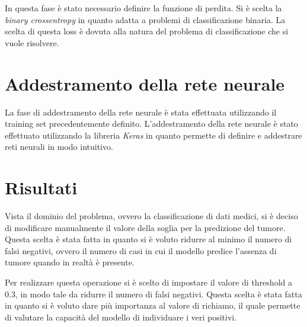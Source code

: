In questa fase è stato necessario definire la funzione di perdita. Si è scelta
la \textit{binary crossentropy} in quanto adatta a problemi di classificazione
binaria. La scelta di questa loss è dovuta alla natura del problema di
classificazione che si vuole risolvere.
\section{Addestramento della rete neurale}
La fase di addestramento della rete neurale è stata effettuata utilizzando il
training set precedentemente definito. L'addestramento della rete neurale è stato
effettuato utilizzando la libreria \textit{Keras} in quanto permette di definire
e addestrare reti neurali in modo intuitivo.
\section{Risultati}
Vista il dominio del problema, ovvero la classificazione di dati medici, si è
deciso di modificare manualmente il valore della soglia per la predizione
del tumore. Questa scelta è stata fatta in quanto si è voluto ridurre al minimo
il numero di falsi negativi, ovvero il numero di casi in cui il modello predice
l'assenza di tumore quando in realtà è presente.

Per realizzare questa operazione si è scelto di impostare il valore di threshold
a $0.3$, in modo tale da ridurre il numero di falsi negativi. Questa scelta è
stata fatta in quanto si è voluto dare più importanza al valore di richiamo, il
quale permette di valutare la capacità del modello di individuare i veri positivi.

